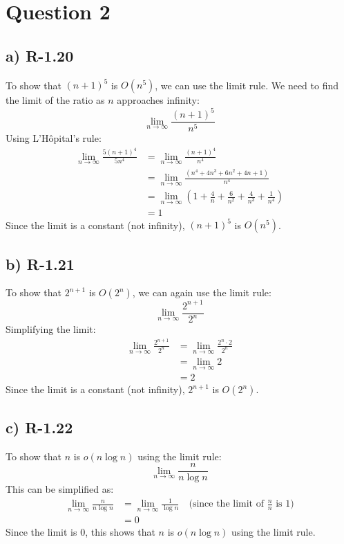 \documentclass[12pt, letterpaper]{article}
\begin{document}
\newpage

\section{Question 2}

\subsection{a) R-1.20}
To show that \((n + 1)^5\) is \(O(n^5)\), we can use the limit rule. We need to find the limit of the ratio as \(n\) approaches infinity:
\[
\lim_{{n \to \infty}} \frac{(n + 1)^5}{n^5}
\]
Using L'Hôpital's rule:
\[
\begin{align*}
\lim_{{n \to \infty}} \frac{5(n + 1)^4}{5n^4} &= \lim_{{n \to \infty}} \frac{(n + 1)^4}{n^4} \\
&= \lim_{{n \to \infty}} \frac{(n^4 + 4n^3 + 6n^2 + 4n + 1)}{n^4} \\
&= \lim_{{n \to \infty}} \left(1 + \frac{4}{n} + \frac{6}{n^2} + \frac{4}{n^3} + \frac{1}{n^4}\right) \\
&= 1
\end{align*}
\]
Since the limit is a constant (not infinity), \((n + 1)^5\) is \(O(n^5)\).

\subsection{b) R-1.21}
To show that \(2^{n+1}\) is \(O(2^n)\), we can again use the limit rule:
\[
\lim_{{n \to \infty}} \frac{2^{n+1}}{2^n}
\]
Simplifying the limit:
\[
\begin{align*}
\lim_{{n \to \infty}} \frac{2^{n+1}}{2^n} &= \lim_{{n \to \infty}} \frac{2^n \cdot 2}{2^n} \\
&= \lim_{{n \to \infty}} 2 \\
&= 2
\end{align*}
\]
Since the limit is a constant (not infinity), \(2^{n+1}\) is \(O(2^n)\).

\subsection{c) R-1.22}
To show that \(n\) is \(o(n \log n)\) using the limit rule:
\[
\lim_{{n \to \infty}} \frac{n}{n \log n}
\]
This can be simplified as:
\[
\begin{align*}
\lim_{{n \to \infty}} \frac{n}{n \log n} &= \lim_{{n \to \infty}} \frac{1}{\log n} \quad \text{(since the limit of \(\frac{n}{n}\) is 1)} \\
&= 0
\end{align*}
\]
Since the limit is 0, this shows that \(n\) is \(o(n \log n)\) using the limit rule.
\end{document}
